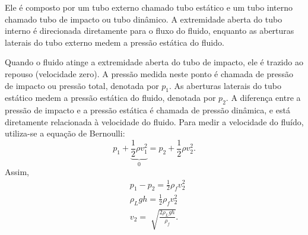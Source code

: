 \documentclass[PhysicsII/physicsII_notes.tex]{subfiles}
\begin{document}
Ele é composto por um tubo externo chamado tubo estático e um tubo interno
chamado tubo de impacto ou tubo dinâmico. A extremidade aberta do tubo interno
é direcionada diretamente para o fluxo do fluido, enquanto as aberturas laterais
do tubo externo medem a pressão estática do fluido.

Quando o fluido atinge a extremidade aberta do tubo de impacto, ele é trazido
ao repouso (velocidade zero). A pressão medida neste ponto é chamada de pressão
de impacto ou pressão total, denotada por \(p_{1}\). As aberturas laterais do tubo estático medem a pressão
estática do fluido, denotada por \(p_{2}\). A diferença entre a pressão de impacto e a pressão estática é chamada
de pressão dinâmica, e está diretamente relacionada à velocidade do fluido. Para medir a velocidade
do fluído, utiliza-se a equação de Bernoulli:
\[
	p_{1} + \underbrace{\frac{1}{2}\rho v_{1}^{2}}_{0} = p_{2} + \frac{1}{2}\rho v_{2}^{2}.
\]
Assim,
\begin{align*}
	 & p_{1}-p_{2} = \frac{1}{2}\rho_{f}v_{2}^{2}     \\
	 & \rho_{L}gh = \frac{1}{2}\rho_{f}v_{2}^{2}      \\
	 & v_{2} = \sqrt[]{\frac{2\rho_{L}gh}{\rho_{f}}}.
\end{align*}
\end{document}
